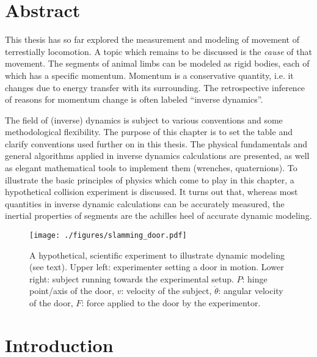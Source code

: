 \clearpage


\section{Abstract}
\label{sec:org983edcb}
This thesis has so far explored the measurement and modeling of movement of terrestially locomotion.
A topic which remains to be discussed is the \emph{cause} of that movement.
The segments of animal limbs can be modeled as rigid bodies, each of which has a specific momentum.
Momentum is a conservative quantity, i.e. it changes due to energy transfer with its surrounding.
The retrospective inference of reasons for momentum change is often labeled ``inverse dynamics''.

The field of (inverse) dynamics is subject to various conventions and some methodological flexibility.
The purpose of this chapter is to set the table and clarify conventions used further on in this thesis.
The physical fundamentals and general algorithms applied in inverse dynamics calculations are presented, as well as elegant mathematical tools to implement them (wrenches, quaternions).
To illustrate the basic principles of physics which come to play in this chapter, a hypothetical collision experiment is discussed.
It turns out that, whereas most quantities in inverse dynamic calculations can be accurately measured, the inertial properties of segments are the achilles heel of accurate dynamic modeling.



\begin{figure}[p]
\centering
\texttt{[image: ./figures/slamming\_door.pdf]}
\caption{\label{fig:slamming}A hypothetical, scientific experiment to illustrate dynamic modeling (see text). Upper left: experimenter setting a door in motion. Lower right: subject running towards the experimental setup. \(P\): hinge point/axis of the door, \(v\): velocity of the subject, \(\dot\theta\): angular velocity of the door, \(F\): force applied to the door by the experimentor.}
\end{figure}


\FloatBarrier\clearpage
\section{Introduction}
\label{sec:orgb2633a1}
